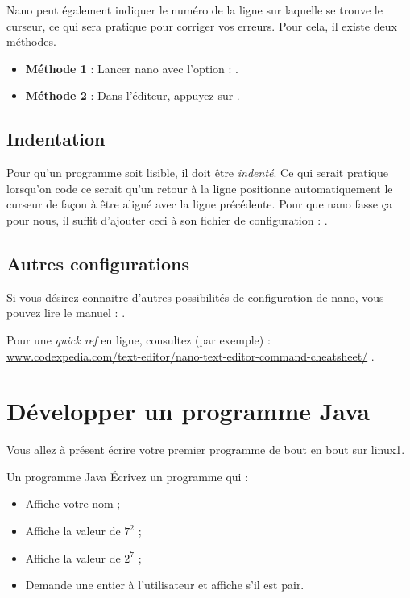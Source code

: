 \documentclass[a4paper,11pt]{style-esi/td}
\begin{document}
		Nano peut également indiquer le numéro de la ligne sur laquelle se trouve le curseur, 
		ce qui sera pratique pour corriger vos erreurs. 
		Pour cela, il existe deux méthodes.

		\begin{itemize} 
		\item \textbf{Méthode 1} : 
			Lancer nano avec l'option  : .
		\item \textbf{Méthode 2} : 
			Dans l'éditeur, appuyez sur .
		\end{itemize}
			
	\subsection{Indentation}
				 
		Pour qu'un programme soit lisible, 
		il doit être \textit{indenté}. 
		Ce qui serait pratique lorsqu'on code ce serait qu'un retour à la ligne 
		positionne automatiquement le curseur de façon à être aligné avec la ligne précédente. 
		Pour que nano fasse ça pour nous, 
		il suffit d'ajouter	ceci à son fichier de configuration : .
			
	\subsection{Autres configurations} 
		
		Si vous désirez connaitre d'autres possibilités de configuration de nano, 
		vous pouvez lire le manuel : .

		Pour une \textit{quick ref} en ligne, consultez (par exemple) : \\
		\url{www.codexpedia.com/text-editor/nano-text-editor-command-cheatsheet/}
		.

\newpage
\section{Développer un programme Java}  
  
	Vous allez à présent écrire votre premier programme de bout en bout sur linux1. 
	
	\begin{Exercice}{Un programme Java}
		Écrivez un programme qui :
		\begin{itemize}
		\item Affiche votre nom ;
		\item Affiche la valeur de $7^2$ ;
		\item Affiche la valeur de $2^7$ ;
		\item Demande une entier à l'utilisateur et affiche s'il est pair. 
		\end{itemize}
	\end{Exercice}
\end{document}
